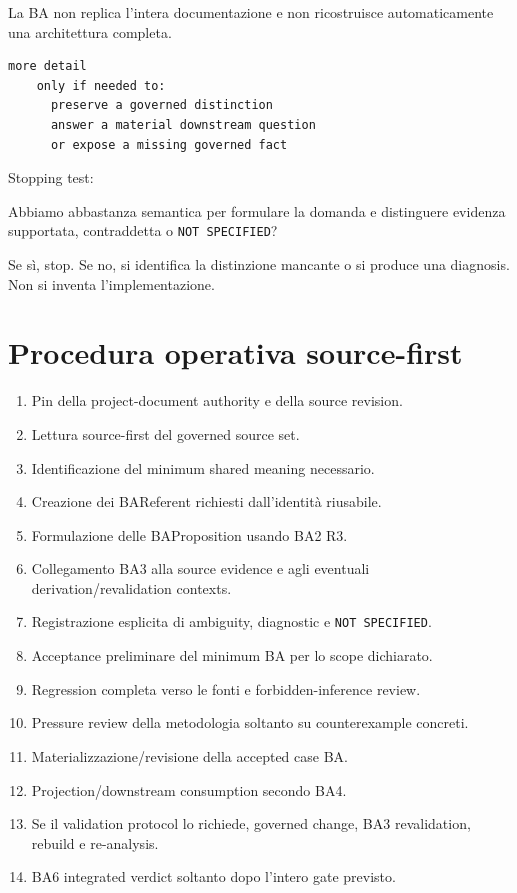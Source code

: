 \documentclass[11pt,a4paper]{article}
\newcommand{\code}[1]{\nolinkurl{#1}}
\begin{document}
La BA non replica l'intera documentazione e non ricostruisce automaticamente una architettura completa.

\begin{lstlisting}
more detail
    only if needed to:
      preserve a governed distinction
      answer a material downstream question
      or expose a missing governed fact
\end{lstlisting}

Stopping test:

\begin{conceptbox}
Abbiamo abbastanza semantica per formulare la domanda e distinguere evidenza supportata, contraddetta o \code{NOT SPECIFIED}?
\end{conceptbox}

Se sì, stop. Se no, si identifica la distinzione mancante o si produce una diagnosis. Non si inventa l'implementazione.

\section{Procedura operativa source-first}

\begin{enumerate}
\item Pin della project-document authority e della source revision.
\item Lettura source-first del governed source set.
\item Identificazione del minimum shared meaning necessario.
\item Creazione dei BAReferent richiesti dall'identità riusabile.
\item Formulazione delle BAProposition usando BA2 R3.
\item Collegamento BA3 alla source evidence e agli eventuali derivation/revalidation contexts.
\item Registrazione esplicita di ambiguity, diagnostic e \code{NOT SPECIFIED}.
\item Acceptance preliminare del minimum BA per lo scope dichiarato.
\item Regression completa verso le fonti e forbidden-inference review.
\item Pressure review della metodologia soltanto su counterexample concreti.
\item Materializzazione/revisione della accepted case BA.
\item Projection/downstream consumption secondo BA4.
\item Se il validation protocol lo richiede, governed change, BA3 revalidation, rebuild e re-analysis.
\item BA6 integrated verdict soltanto dopo l'intero gate previsto.
\end{enumerate}
\end{document}
